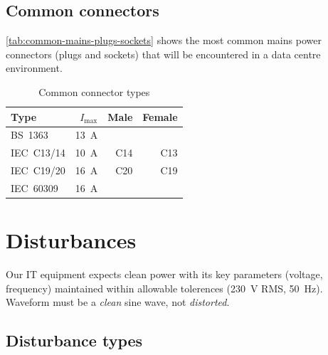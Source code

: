 \documentclass{pgnotes}
\begin{document}
\subsection{Common connectors}

\autoref{tab:common-mains-plugs-sockets} shows the most common mains power connectors (plugs and sockets) that will be encountered in a data centre environment.

\begin{table}[htbp]
  \centering  
  \begin{tabular}{l r r r}
    \toprule
    \textbf{Type} & $I_{\mbox{max}}$ & \textbf{Male} & \textbf{Female} \\
    \midrule
    BS~1363 & \SI{13}{\ampere} & ~ & ~ \\
    \midrule
    IEC~C13/14 & \SI{10}{\ampere} & C14 & C13 \\
    \midrule  
    IEC~C19/20 & \SI{16}{\ampere} & C20 & C19 \\
    \midrule  
    IEC~60309 & \SI{16}{\ampere} & ~ & ~ \\
    \bottomrule
  \end{tabular}
  \caption{Common connector types}
  \label{tab:common-mains-plugs-sockets}
\end{table}


\section{Disturbances}

Our IT equipment expects clean power with its key parameters (voltage, frequency) maintained within allowable tolerences (\SI{230}{\volt} RMS, \SI{50}{\hertz}).
Waveform must be a \textit{clean} sine wave, not \textit{distorted}.

\subsection{Disturbance types}
\end{document}
